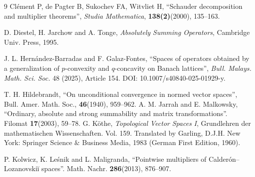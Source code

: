 \documentclass[14pt, a4paper]{article}  %
\begin{document}
\begin{thebibliography}{9}
  Clément P, de Pagter B, Sukochev FA, Witvliet H, ``Schauder decomposition and multiplier theorems'', \emph{Studia Mathematica}, \textbf{138(2)}(2000), 135–163.  
 
  D. Diestel, H. Jarchow and A. Tonge, \emph{ Absolutely Summing Operators}, Cambridge Univ. Press, 1995.   
 

% 
% 
% 
% 
% 
% 

 	
  J. L. Hern{\'a}ndez-Barradas and F. Galaz-Fontes, ``Spaces of operators obtained by a generalization of $p$-convexity and $q$-concavity on Banach lattices'', \emph{Bull. Malays. Math. Sci. Soc.} 48 (2025), Article 154. DOI: 10.1007/s40840-025-01929-y.
 

 
 
 
  	T. H. Hildebrandt,  ``On unconditional convergence in normed vector spaces'', Bull. Amer. Math. Soc., \textbf{46}(1940), 959--962.
% 
  A. M. Jarrah and E. Malkowsky, ``Ordinary, absolute and strong summability and matrix transformations''. Filomat \textbf{17}(2003), 59–78. 
% 
  G. Köthe, \emph{Topological Vector Spaces I}, Grundlehren der mathematischen Wissenschaften. Vol. 159. Translated by Garling, D.J.H. New York: Springer Science $\&$ Business Media, 1983 (German First Edition, 1960).
 
% 
% 
  P. Kolwicz, K. Le\'{s}nik and L. Maligranda, ``Pointwise multipliers of Calderón–Lozanovskiĭ spaces''. Math. Nachr. \textbf{286}(2013), 876–907. 
 

\end{thebibliography}
\end{document}
